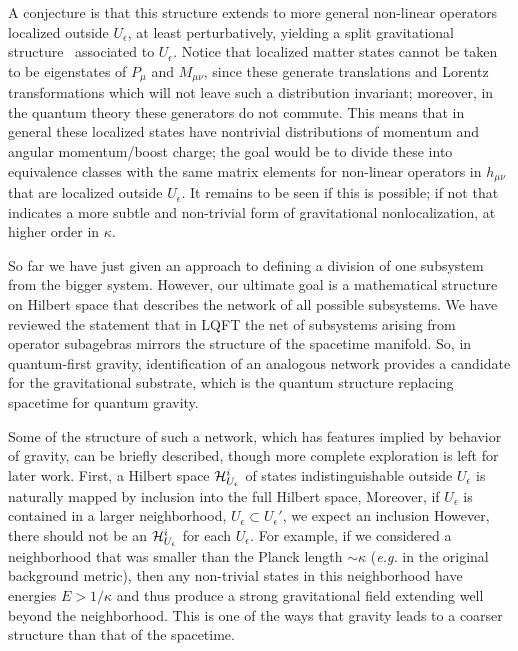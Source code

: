 A conjecture is that this structure extends to more general non-linear operators localized outside $U_\epsilon$, at least perturbatively, yielding a split gravitational structure \splstr\ associated to $U_\epsilon$.  Notice that localized matter states cannot be taken to be eigenstates of $P_\mu$ and $M_{\mu\nu}$, since these generate translations and Lorentz transformations which will not leave such a distribution invariant; moreover, in the quantum theory these generators do not commute.  This means that in general these localized states have nontrivial distributions of momentum and angular momentum/boost charge; the goal would be to divide these into equivalence classes with the same matrix elements for non-linear operators in $h_{\mu\nu}$ that are localized outside $U_\epsilon$.  It remains to be seen if this is possible; if not that indicates a more subtle and non-trivial form of gravitational nonlocalization, at higher order in $\kappa$.

So far we have just given an approach to defining a division of one subsystem from the bigger system.  However, our ultimate goal is a mathematical structure on Hilbert space that describes the network of all possible subsystems.  We have reviewed the statement that in LQFT the net of subsystems arising from operator subagebras mirrors the structure of the spacetime manifold. So, in quantum-first gravity, identification of an analogous network provides a candidate for the gravitational substrate, which is the quantum structure replacing spacetime for quantum gravity.

Some of the structure of such a network, which has features implied by behavior of gravity, can be briefly described, though more complete exploration is left for later work.  First, a Hilbert space ${\cal H}^i_{U_\epsilon}$ of states indistinguishable outside $U_\epsilon$ is naturally mapped by inclusion into the full Hilbert space,
%
\eqn{}
%
Moreover, if $U_\epsilon$ is contained in a larger neighborhood, $U_\epsilon \subset U_\epsilon'$, we expect an inclusion
%
\eqn{}
%
However, there should not be an ${\cal H}^i_{U_\epsilon}$ for each $U_\epsilon$.  For example, if we considered a neighborhood that was smaller than the Planck length $\sim \kappa$ ({\it e.g.} in the original background metric), then any non-trivial states in this neighborhood have energies $E>1/\kappa$ and thus produce a strong gravitational field extending well beyond the neighborhood.  This is one of the ways that gravity leads to a coarser structure than that of the spacetime.


